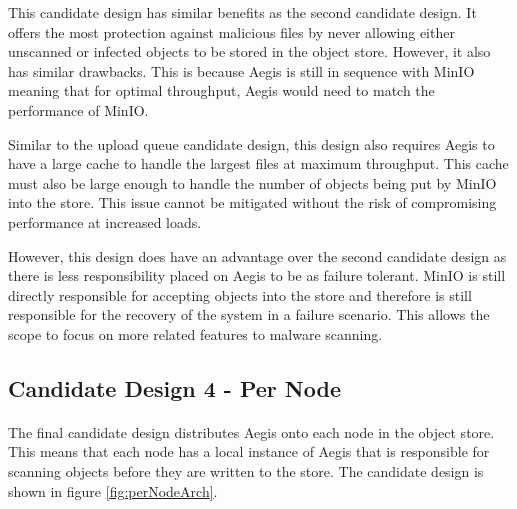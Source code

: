 \documentclass[12pt, conference, final, a4paper, onecolumn, compsoc]{IEEEtran}
\begin{document}
This candidate design has similar benefits as the second candidate design. It
offers the most protection against malicious files by never allowing either
unscanned or infected objects to be stored in the object store. However, it also
has similar drawbacks. This is because Aegis is still in sequence with MinIO
meaning that for optimal throughput, Aegis would need to match the performance
of MinIO.

Similar to the upload queue candidate design, this design also requires Aegis to
have a large cache to handle the largest files at maximum throughput. This cache
must also be large enough to handle the number of objects being put by MinIO
into the store. This issue cannot be mitigated without the risk of compromising
performance at increased loads.

However, this design does have an advantage over the second candidate design as
there is less responsibility placed on Aegis to be as failure tolerant. MinIO is
still directly responsible for accepting objects into the store and therefore is
still responsible for the recovery of the system in a failure scenario. This
allows the scope to focus on more related features to malware scanning.

\subsection{Candidate Design 4 - Per Node}
\paragraph{}

The final candidate design distributes Aegis onto each node in the object store.
This means that each node has a local instance of Aegis that is responsible for
scanning objects before they are written to the store. The candidate design is
shown in figure \ref{fig:perNodeArch}.
\end{document}

